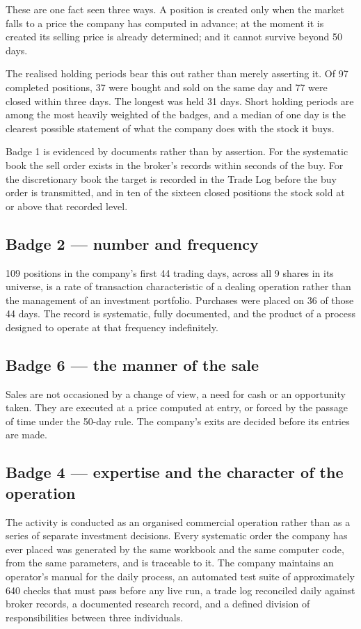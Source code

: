 \documentclass[11pt]{article}
\begin{document}
These are one fact seen three ways. A position is created only when the market falls to a price
the company has computed in advance; at the moment it is created its selling price is already
determined; and it cannot survive beyond 50 days.

The realised holding periods bear this out rather than merely asserting it. Of 97 completed
positions, 37 were bought and sold on the same day and 77 were closed within three days. The
longest was held 31 days. Short holding periods are among the most heavily weighted of the badges,
and a median of one day is the clearest possible statement of what the company does with the stock
it buys.

Badge 1 is evidenced by documents rather than by assertion. For the systematic book the sell order
exists in the broker's records within seconds of the buy. For the discretionary book the target is
recorded in the Trade Log before the buy order is transmitted, and in ten of the sixteen closed
positions the stock sold at or above that recorded level.

\subsection{Badge 2 --- number and frequency}

109 positions in the company's first 44 trading days, across all 9 shares in its universe, is a
rate of transaction characteristic of a dealing operation rather than the management of an
investment portfolio. Purchases were placed on 36 of those 44 days. The record is systematic,
fully documented, and the product of a process designed to operate at that frequency indefinitely.

\subsection{Badge 6 --- the manner of the sale}

Sales are not occasioned by a change of view, a need for cash or an opportunity taken. They are
executed at a price computed at entry, or forced by the passage of time under the 50-day rule. The
company's exits are decided before its entries are made.

\subsection{Badge 4 --- expertise and the character of the operation}

The activity is conducted as an organised commercial operation rather than as a series of separate
investment decisions. Every systematic order the company has ever placed was generated by the same
workbook and the same computer code, from the same parameters, and is traceable to it. The company
maintains an operator's manual for the daily process, an automated test suite of approximately 640
checks that must pass before any live run, a trade log reconciled daily against broker records, a
documented research record, and a defined division of responsibilities between three individuals.
\end{document}

